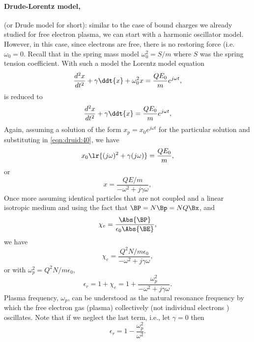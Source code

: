 \paragraph{Drude-Lorentz model,} (or Drude model for short): similar to the case of bound charges we already studied for free electron plasma, we can start with a harmonic oscillator model.  However, in this case, since electrons are free, there is no restoring force (i.e. \(\omega_0 = 0 \).  Recall that in the spring mass model \( \omega_0^2 = S/m \) where \( S \) was the spring tension coefficient.
%
With such a model the Lorentz model equation
%
\begin{dmath}\label{eqn:druid:20}
\frac{d^2 x}{dt^2} + \gamma \ddt{x} + \omega_0^2 x = \frac{Q E_0}{m} e^{j \omega t},
\end{dmath}
%
is reduced to
%
\begin{dmath}\label{eqn:druid:40}
\frac{d^2 x}{dt^2} + \gamma \ddt{x} = \frac{Q E_0}{m} e^{j \omega t},
\end{dmath}
%
Again, assuming a solution of the form \( x_p = x_0 e^{j \omega t} \) for the particular solution and substituting in \cref{eqn:druid:40}, we have
%
\begin{dmath}\label{eqn:druid:80}
x_0 \lr{ (j\omega)^2 + \gamma (j \omega)} = \frac{Q E_0}{m},
\end{dmath}
%
or
\begin{dmath}\label{eqn:druid:60}
x
=
\frac{Q E/m}{-\omega^2 + j \gamma \omega },
\end{dmath}
%
Once more assuming identical particles that are not coupled and a linear isotropic medium and using the fact that \( \BP = N \Bp = N Q \Bx \), and
%
\begin{dmath}\label{eqn:druid:100}
\chi_e = \frac{\Abs{\BP}}{\epsilon_0 \Abs{\BE} },
\end{dmath}
%
we have
%
\begin{dmath}\label{eqn:druid:120}
\chi_e
=
\frac{Q^2 N/m \epsilon_0}{-\omega^2 + j \gamma \omega },
\end{dmath}
%
or with \( \omega_p^2 = Q^2 N/m\epsilon_0\),
%
\begin{dmath}\label{eqn:druid:140}
\epsilon_r
= 1 + \chi_e
=
1+
\frac{\omega_p^2}{-\omega^2 + j \gamma \omega }.
\end{dmath}
%
Plasma frequency, \( \omega_p \), can be understood as the natural resonance frequency by which the free electron gas (plasma) collectively (not individual electrons ) oscillates.
%
Note that if we neglect the last term, i.e., let \( \gamma = 0 \) then
%
\begin{dmath}\label{eqn:druid:160}
\epsilon_r = 1 - \frac{\omega_p^2}{\omega^2}.
\end{dmath}
